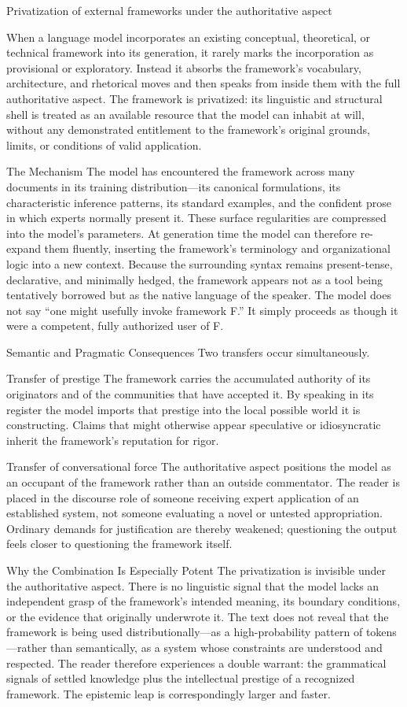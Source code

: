 Privatization of external frameworks under the authoritative aspect

When a language model incorporates an existing conceptual, theoretical, or technical framework into its generation, it rarely marks the incorporation as provisional or exploratory. Instead it absorbs the framework’s vocabulary, architecture, and rhetorical moves and then speaks from inside them with the full authoritative aspect. The framework is privatized: its linguistic and structural shell is treated as an available resource that the model can inhabit at will, without any demonstrated entitlement to the framework’s original grounds, limits, or conditions of valid application.

The Mechanism
The model has encountered the framework across many documents in its training distribution—its canonical formulations, its characteristic inference patterns, its standard examples, and the confident prose in which experts normally present it. These surface regularities are compressed into the model’s parameters. At generation time the model can therefore re-expand them fluently, inserting the framework’s terminology and organizational logic into a new context. Because the surrounding syntax remains present-tense, declarative, and minimally hedged, the framework appears not as a tool being tentatively borrowed but as the native language of the speaker. The model does not say “one might usefully invoke framework F.” It simply proceeds as though it were a competent, fully authorized user of F.

Semantic and Pragmatic Consequences
Two transfers occur simultaneously.

Transfer of prestige  
   The framework carries the accumulated authority of its originators and of the communities that have accepted it. By speaking in its register the model imports that prestige into the local possible world it is constructing. Claims that might otherwise appear speculative or idiosyncratic inherit the framework’s reputation for rigor.

Transfer of conversational force  
   The authoritative aspect positions the model as an occupant of the framework rather than an outside commentator. The reader is placed in the discourse role of someone receiving expert application of an established system, not someone evaluating a novel or untested appropriation. Ordinary demands for justification are thereby weakened; questioning the output feels closer to questioning the framework itself.

Why the Combination Is Especially Potent
The privatization is invisible under the authoritative aspect. There is no linguistic signal that the model lacks an independent grasp of the framework’s intended meaning, its boundary conditions, or the evidence that originally underwrote it. The text does not reveal that the framework is being used distributionally—as a high-probability pattern of tokens—rather than semantically, as a system whose constraints are understood and respected. The reader therefore experiences a double warrant: the grammatical signals of settled knowledge plus the intellectual prestige of a recognized framework. The epistemic leap is correspondingly larger and faster.


